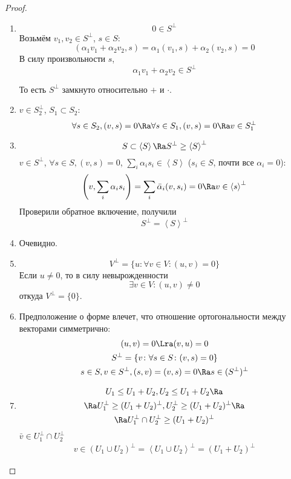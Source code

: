 \begin{proof}
	\begin{enumerate}
	\item
		\[ 0 \in S^\bot \]
		Возьмём $v_1, v_2 \in S^\bot$, $s \in S$:
		\[ (\alpha_1 v_1 + \alpha_2 v_2, s) = \alpha_1(v_1, s) + \alpha_2(v_2, s) = 0 \]
		В силу произвольности $s$,
		\[ \alpha_1 v_1 + \alpha_2 v_2 \in S^\bot \]

		То есть $S^{\bot}$ замкнуто относительно $+$ и $\cdot$.

	\item
		$v \in S_2^\bot$, $S_1 \subset S_2$:
		\[
			\forall s \in S_2, (v, s) = 0
			\Ra \forall s \in S_1, (v, s) = 0
			\Ra v  \in S_1^\bot
		\]

	\item
		\[
			S \subset \left<S\right> \Ra S^\bot \ge \left<S\right>^\bot
		\]
		$v \in S^\bot$, $\forall s \in S, (v, s) = 0$,
		$\sum_i \alpha_i s_i \in \left<S\right>$ ($s_i \in S$, почти все $\alpha_i = 0$):
		\[
			\left(v, \sum_i \alpha_i s_i\right) = \sum_i \bar \alpha_i (v, s_i) = 0
			\Ra v \in \left<s\right>^\bot
		\]
		Проверили обратное включение, получили
		\[ S^\bot = \left<S\right>^\bot \]

	\item
		Очевидно.

	\item
		\[ V^\bot = \{u \colon \forall v \in V \colon (u, v) = 0\} \]
		Если $u \ne 0$, то в силу невырожденности
		\[ \exists v \in V \colon (u, v) \ne 0 \]
		откуда $V^\bot = \{0\}$.

	\item
		Предположение о форме влечет, что отношение ортогональности между векторами симметрично:
		\begin{gather*}
			(u, v) = 0 \Lra (v, u) = 0 \\
			S^\bot = \{v\colon \forall s \in S \colon (v, s) = 0\} \\
			s \in S, v \in S^\bot, (s, v) = (v, s) = 0 \Ra s \in (S^\bot)^\bot
		\end{gather*}

	\item
		\begin{gather*}
			U_1 \le U_1 + U_2, U_2 \le U_1 + U_2 \Ra \\
			\Ra U_1^\bot \ge (U_1 + U_2)^\bot, U_2^\bot \ge (U_1 + U_2)^\bot \Ra \\
			\Ra U_1^\bot \cap U_2^\bot \ge (U_1 + U_2)^\bot
		\end{gather*}
		$\bar v \in  U_1^\bot \cap U_2^\bot$
		\begin{gather*}
			v \in (U_1 \cup U_2)^\bot = \left<U_1 \cup U_2\right>^\bot = (U_1 + U_2)^\bot
		\end{gather*}


\end{enumerate}
\end{proof}
